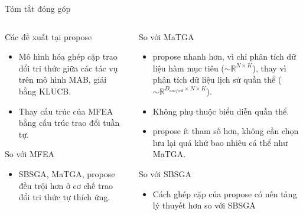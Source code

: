 \begin{frame}{Tóm tắt đóng góp}
    \begin{columns}
        \begin{column}{0.48\textwidth}
            \begin{block}{Các đề xuất tại \gls{propose}}
                \begin{itemize}
                    \item Mô hình hóa ghép cặp trao đổi tri thức giữa các tác vụ trên mô hình MAB, giải bằng KLUCB.
                    \item Thay cấu trúc của MFEA bằng cấu trúc trao đổi tuần tự.
                \end{itemize}
            \end{block}
            \begin{block}{So với MFEA}
                \begin{itemize}
                    \item SBSGA, MaTGA, \gls{propose} đều trội hơn ở cơ chế trao đổi tri thức tự thích ứng.
                \end{itemize}
            \end{block}
        \end{column}
        \begin{column}{0.48\textwidth}
            \begin{block}{So với MaTGA}
                \begin{itemize}
                    \item \gls{propose} nhanh hơn, vì chỉ phân tích dữ liệu hàm mục tiêu ($\sim \mathbb{R}^{N \times K}$), thay vì phân tích dữ liệu lịch sử quần thể ($\sim \mathbb{R}^{D_{unified} \times N \times K}$).
                    \item Không phụ thuộc biểu diễn quần thể.
                    \item \gls{propose} ít tham số hơn, không cần chọn lưu lại quá khứ bao nhiêu cá thể như MaTGA.
                \end{itemize}
            \end{block}
            \begin{block}{So với SBSGA}
                \begin{itemize}
                    \item Cách ghép cặp của \gls{propose} có nên tảng lý thuyết hơn so với SBSGA
                \end{itemize}
            \end{block}        
        \end{column}
    \end{columns}
\end{frame}

